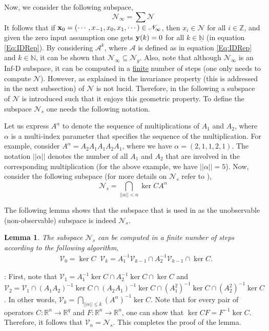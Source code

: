 \documentclass[journal,12pt,draftcls,onecolumn]{IEEEtran}
\newcommand{\ssp}[1]{\mathscr{#1}}      \newcommand{\setssp}[1]{\mathfrak{#1}}   \newcommand{\fld}[1]{\mathbb{#1}}       \newcommand{\op}[1]{\mathcal{#1}}       \newcommand{\sumbanach}[1]{\sum{#1}}
\newcommand{\infd}{Inf-D }
\def\QEDclosed{\hfill\IEEEQEDclosed}
\renewcommand{\qed}{\QEDclosed}
\renewenvironment{proof}[1][\proofname]{\noindent\nobreakspace{\bfseries #1}:\;}{\qed\par}
\newtheorem{lemma}{Lemma}
\begin{document}
Now, we consider the following subspace,
\begin{equation}\label{Eq:UnobsSpaceInfinite}
	\ssp{N}_\infty = \sumbanach{\ssp{N}}
\end{equation}
It follows that if ${\bf x}_0 = (\cdots,x_{-1},x_0,x_{1},\cdots)\in\ssp{N}_\infty$, then $x_{i}\in\ssp{N}$ for all $i\in\fld{Z}$, and given the zero input assumption one gets ${\bf y}(k)=0$ for all $k\in\underline{\fld{N}}$ (in equation \eqref{Eq:IDRep}). By considering $\op{A}^k$, where $\op{A}$ is defined as in equation \eqref{Eq:IDRep} and $k\in\fld{N}$, it can be shown that $\ssp{N}_\infty\subseteq\ssp{N}_g$. Also, note that although $\ssp{N}_\infty$ is an \infd subspace, it can be computed in a \underline{finite} number of steps (one only needs to compute $\ssp{N}$). However, as explained in \cite{ACC2013,ACC2014} the invariance property (this is addressed in the next subsection) of $\ssp{N}$ is not lucid. Therefore, in the following a subspace of $\ssp{N}$ is introduced such that it enjoys this geometric property. To define the subspace $\ssp{N}_s$ one needs the following notation.

Let us express $A^{\alpha}$ to denote the sequence of multiplications of $A_1$ and $A_2$,  where $\alpha$ is a multi-index parameter that specifies the sequence of the multiplication.  For example, consider $A^\alpha = A_2A_1A_1A_2A_1$, where we have $\alpha = (2,1,1,2,1)$.
The notation $||\alpha||$ denotes the number of all $A_1$ and $A_2$ that are involved in the corresponding multiplication (for the above example, we have $||\alpha|| = 5$). Now, consider the following subspace (for more details on $\ssp{N}_s$ refer to \cite{ACC2013}),
\begin{equation}
	\ssp{N}_s = \bigcap_{||\alpha||<n}\ker CA^\alpha
\end{equation}

The following lemma shows that the subspace that is used in \cite{ntogramatzidis2012Siam, Malek_3DFDI, Malek_3DFDIConf} as the unobservable (non-observable) subspace is indeed $\ssp{N}_s$.


\begin{lemma}\label{Lm:NsisSub}
	The subspace $\ssp{N}_s$ can be computed in a finite number of steps according to the following algorithm,
	\begin{equation}\label{Eq:NsAlg}
		\begin{split}
			&\ssp{V}_0 = \ker C\;\;	\ssp{V}_k = A_1^{-1}\ssp{V}_{k-1}\cap A_2^{-1}\ssp{V}_{k-1}\cap\ker C.
		\end{split}
	\end{equation}
\end{lemma}
\begin{proof}
	First, note that $\ssp{V}_1 = A_1^{-1}\ker C\cap A_2^{-1}\ker C\cap\ker C$ and $\ssp{V}_2 = \ssp{V}_1 \cap (A_1A_2)^{-1}\ker C \cap (A_2A_1)^{-1}\ker C\cap(A_1^2)^{-1}\ker C \cap (A_2^2)^{-1}\ker C$. In other words, $\ssp{V}_k=\bigcap_{||\alpha||\leq k}(A^{\alpha})^{-1}\ker C$. Note that for every pair of operators $C:\fld{R}^n\rightarrow \fld{R}^q$ and $F:\fld{R}^n\rightarrow \fld{R}^n$, one can show that $\ker CF=F^{-1}\ker C$. Therefore, it follows that $\ssp{V}_n = \ssp{N}_s$. This completes the proof of the lemma.
\end{proof}
\end{document}
